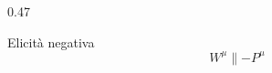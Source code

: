 \documentclass[11pt,t,aspectratio=169]{beamer}
\begin{document}
\begin{frame}[c]
\begin{columns}[T,onlytextwidth]
\begin{column}{0.47\textwidth}
\begin{block}{Elicità negativa}
                \[
                    W^\mu\parallel -P^\mu
                \]

            \end{block}

        \end{column}

    \end{columns}

\end{frame}




\end{document}
